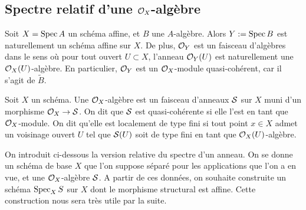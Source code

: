 \subsection{Spectre relatif d'une $\Oo_X$-algèbre}

Soit $X=\operatorname{Spec} A$ un schéma affine, et $B$ une $A$-algèbre. Alors $Y:=\operatorname{Spec} B$ est naturellement un schéma affine sur $X$. De plus, $\mathcal{O}_Y$ est un faisceau d'algèbres dans le sens où pour tout ouvert $U\subset X$, l'anneau $\mathcal{O}_Y(U)$ est naturellement une $\mathcal{O}_X(U)$-algèbre. En particulier, $\mathcal{O}_Y$ est un $\Oo_X$-module quasi-cohérent, car il s'agit de $\widetilde{B}$.

\begin{defn}[$\Oo_X$-algèbre]
Soit $X$ un schéma. Une $\Oo_X$-algèbre est un faisceau d'anneaux $\mathcal{S}$ sur $X$ muni d'un morphisme $\mathcal{O}_X\rightarrow \mathcal{S}$. On dit que $\mathcal{S}$ est quasi-cohérente si elle l'est en tant que $\Oo_X$-module. On dit qu'elle est localement de type fini si tout point $x\in X$ admet un voisinage ouvert $U$ tel que $\mathcal{S}(U)$ soit de type fini en tant que $\mathcal{O}_X(U)$-algèbre.
\end{defn}

On introduit ci-dessous la version relative du spectre d'un anneau. On se donne un schéma de base $X$ que l'on suppose séparé pour les applications que l'on a en vue, et une $\Oo_X$-algèbre $\mathcal{S}$. A partir de ces données, on souhaite construite un schéma $\operatorname{Spec}_X S$ sur $X$ dont le morphisme structural est affine. Cette construction nous sera très utile par la suite.

